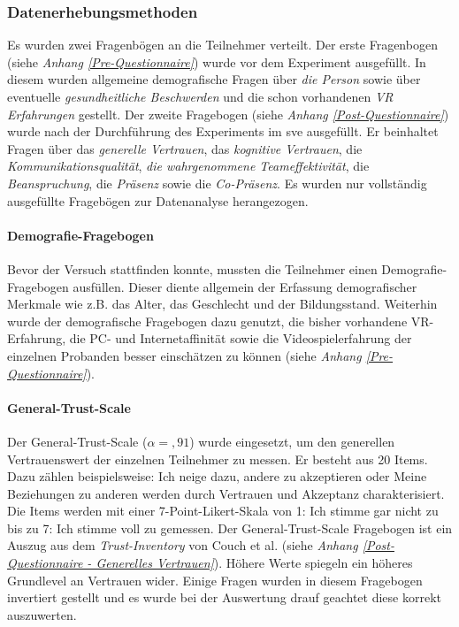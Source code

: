 \documentclass[a4paper,11pt]{article}%
\renewcommand{\\}{\vspace*{0.5\baselineskip} \newline}
\begin{document}
			\subsubsection{Datenerhebungsmethoden}
Es wurden zwei Fragenbögen an die Teilnehmer verteilt. Der erste Fragenbogen (siehe \textit{Anhang \ref{Pre-Questionnaire}}) wurde vor dem Experiment ausgefüllt. In diesem wurden allgemeine demografische Fragen über \textit{die Person} sowie über eventuelle \textit{gesundheitliche Beschwerden} und die schon vorhandenen \textit{VR Erfahrungen} gestellt. Der zweite Fragebogen (siehe \textit{Anhang \ref{Post-Questionnaire}}) wurde nach der Durchführung des Experiments im \ac{sve} ausgefüllt. Er beinhaltet Fragen über das \textit{generelle Vertrauen}, das \textit{kognitive Vertrauen}, die \textit{Kommunikationsqualität}, \textit{die wahrgenommene Teameffektivität}, die \textit{Beanspruchung}, die \textit{Präsenz} sowie die \textit{Co-Präsenz}. 
Es wurden nur vollständig ausgefüllte Fragebögen zur Datenanalyse herangezogen. \\
				
		\paragraph{Demografie-Fragebogen}
Bevor der Versuch stattfinden konnte, mussten die Teilnehmer einen Demografie-Fragebogen ausfüllen. Dieser diente allgemein der Erfassung demografischer Merkmale wie z.B. das Alter, das Geschlecht und der Bildungsstand. Weiterhin wurde der demografische Fragebogen dazu genutzt, die bisher vorhandene VR-Erfahrung, die PC- und Internetaffinität sowie die Videospielerfahrung der einzelnen Probanden besser einschätzen zu können (siehe \textit{Anhang \ref{Pre-Questionnaire}}).

		\paragraph{General-Trust-Scale}
Der General-Trust-Scale ($\alpha =,91$) \citep{couch1996assessment} wurde eingesetzt, um den generellen Vertrauenswert der einzelnen Teilnehmer zu messen. Er besteht aus 20 Items. Dazu zählen beispielsweise: \glqq{}Ich neige dazu, andere zu akzeptieren\dq{} oder \glqq{}Meine Beziehungen zu anderen werden durch Vertrauen und Akzeptanz charakterisiert\dq{}. Die Items werden mit einer 7-Point-Likert-Skala von 1: \glqq{}Ich stimme gar nicht zu\dq{} bis zu 7: \glqq{}Ich stimme voll zu\dq{} gemessen. Der General-Trust-Scale Fragebogen ist ein Auszug aus dem \textit{Trust-Inventory} von Couch et al. (siehe \textit{Anhang \ref{Post-Questionnaire - Generelles Vertrauen}}). Höhere Werte spiegeln ein höheres Grundlevel an Vertrauen wider. Einige Fragen wurden in diesem Fragebogen invertiert gestellt und es wurde bei der Auswertung drauf geachtet diese korrekt auszuwerten.
\end{document}
